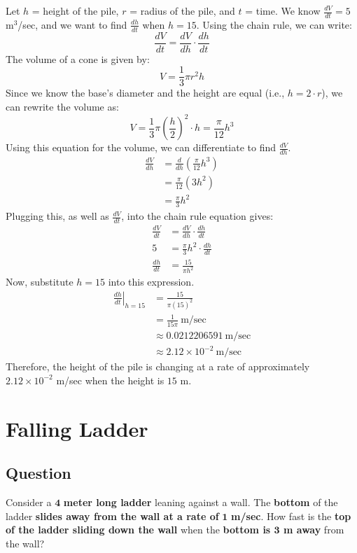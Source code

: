 \documentclass[12pt]{article}
\newcommand\at[2]{\left.#1\right|_{#2}}
\begin{document}
Let $ h $ = height of the pile, $ r $ = radius of the pile, and $ t $ = time.
\medskip
\newline
We know $ \frac{dV}{dt} = 5 $ m$ ^3 $/sec, and we want to find $ \frac{dh}{dt} $ when $ h = 15 $. Using the chain rule, we can write:
\[ \frac{dV}{dt} = \frac{dV}{dh} \cdot \frac{dh}{dt} \]
The volume of a cone is given by:
\[ V = \frac{1}{3} \pi r^2 h \]
Since we know the base's diameter and the height are equal (i.e., $ h = 2 \cdot r $), we can rewrite the volume as:
\[ V = \frac{1}{3} \pi \left( \frac{h}{2} \right)^2 \cdot h = \frac{\pi}{12} h^3 \]
Using this equation for the volume, we can differentiate to find $ \frac{dV}{dh} $.
\begin{align*}
    \frac{dV}{dh} & = \frac{d}{dh} \left( \frac{\pi}{12} h^3 \right) \\
    & = \frac{\pi}{12} \left( 3 h^2 \right) \\
    & = \frac{\pi}{3} h^2
\end{align*}
Plugging this, as well as $ \frac{dV}{dt} $, into the chain rule equation gives:
\begin{align*}
    \frac{dV}{dt} & = \frac{dV}{dh} \cdot \frac{dh}{dt} \\
    5 & = \frac{\pi}{3} h^2 \cdot \frac{dh}{dt} \\
    \frac{dh}{dt} & = \frac{15}{\pi h^2}
\end{align*}
Now, substitute $ h = 15 $ into this expression.
\begin{align*}
    \at{\frac{dh}{dt}}{h = 15} & = \frac{15}{\pi \left( 15 \right)^2} \\
    & = \frac{1}{15 \pi} \ \text{m/sec} \\
    & \approx 0.0212206591 \ \text{m/sec} \\
    & \approx 2.12 \times 10^{-2} \ \text{m/sec}
\end{align*}
Therefore, the height of the pile is changing at a rate of approximately $ 2.12 \times 10^{-2} $ m/sec when the height is $ 15 $ m.

\section*{Falling Ladder}

\subsection*{Question}

Consider a $ \mathbf{4} $ \textbf{meter long ladder} leaning against a wall. The \textbf{bottom} of the ladder \textbf{slides away from the wall at a rate of} $ \mathbf{1} $ \textbf{m/sec}. How fast is the \textbf{top of the ladder sliding down the wall} when the \textbf{bottom is $ \mathbf{3} $ m away} from the wall?
\end{document}
